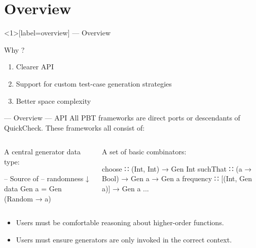 \section{Overview}

\begin{frame}<1>[label=overview]{\halcheck{} --- Overview }
  \begin{block}{Why \halcheck?}
    \begin{enumerate}
      \item<alert@1> Clearer API
      \item<alert@2> Support for custom test-case generation strategies
      \item<alert@3> Better space complexity
    \end{enumerate}
  \end{block}
\end{frame}

\begin{frame}[fragile]{\halcheck{} --- Overview --- API}
  All PBT frameworks are direct ports or descendants of QuickCheck. These frameworks all consist of:

  \bigskip{}
  \pause{}

  \begin{columns}[T,onlytextwidth]
    \begin{column}{0.47\textwidth}
      \begin{block}{A central generator data type:}
        \begin{haskellcode}
          --     Source of
          --     randomness ↓
          data Gen a = Gen (Random → a)
        \end{haskellcode}
      \end{block}
    \end{column}

    \pause{}

    \begin{column}{0.53\textwidth}
      \begin{block}{A set of basic combinators:}
        \begin{haskellcode}
          choose    ∷ (Int, Int) → Gen Int
          suchThat  ∷ (a → Bool) → Gen a → Gen a
          frequency ∷ [(Int, Gen a)] → Gen a
          ...
        \end{haskellcode}
      \end{block}
    \end{column}
  \end{columns}

  \pause{}

  \bigskip{}

  \begin{itemize}
    \item Users must be comfortable reasoning about higher-order functions.
    \item Users must ensure generators are only invoked in the \alert{correct context}.
  \end{itemize}
\end{frame}


